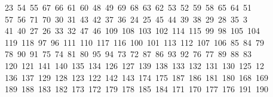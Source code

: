 \begin{tabbing}
\>\ 23\ 54\ 55\ 67\ 66\ 61\ 60\ 48\ 49\ 69\ 68\ 63\ 62\ 53\ 52\ 59\ 58\ 65\ 64\ 51\ \\[0pt]
\ 57\ 56\ 71\ 70\ 30\ 31\ 43\ 42\ 37\ 36\ 24\ 25\ 45\ 44\ 39\ 38\ 29\ 28\ 35\ 3\\[0pt]
\ 41\ 40\ 27\ 26\ 33\ 32\ 47\ 46\ 109\ 108\ 103\ 102\ 114\ 115\ 99\ 98\ 105\ 104\\[0pt]
\>\ 119\ 118\ 97\ 96\ 111\ 110\ 117\ 116\ 100\ 101\ 113\ 112\ 107\ 106\ 85\ 84\ 79\\[0pt]
\>\ 78\ 90\ 91\ 75\ 74\ 81\ 80\ 95\ 94\ 73\ 72\ 87\ 86\ 93\ 92\ 76\ 77\ 89\ 88\ 83\ \\[0pt]
\ 120\ 121\ 141\ 140\ 135\ 134\ 126\ 127\ 139\ 138\ 133\ 132\ 131\ 130\ 125\ 12\\[0pt]
\ 136\ 137\ 129\ 128\ 123\ 122\ 142\ 143\ 174\ 175\ 187\ 186\ 181\ 180\ 168\ 169\\[0pt]
\>\ 189\ 188\ 183\ 182\ 173\ 172\ 179\ 178\ 185\ 184\ 171\ 170\ 177\ 176\ 191\ 190\\[0pt]

\end{tabbing}
